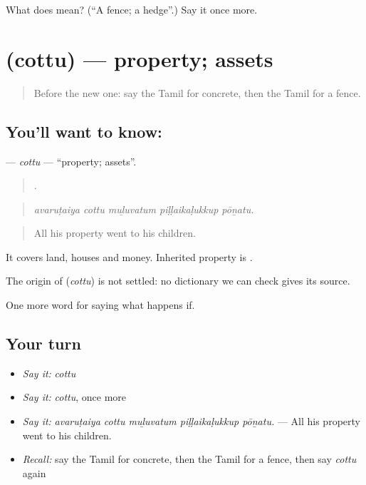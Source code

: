\begin{tcolorbox}[breakable,colback=teal!4,colframe=teal!35!black,title={Before you move on}]
What does  mean? (\textquotedblleft{}A fence; a hedge\textquotedblright{}.) Say it once more.
\end{tcolorbox}
\section[\texorpdfstring{\ta{சொத்து} (cottu)}{சொத்து (cottu)}]{ (cottu) — property; assets}

\label{lesson:TA-C551-cottu}



\begin{quote}
Before the new one: say the Tamil for concrete, then the Tamil for a fence.
\end{quote}

\subsection*{You'll want to know: }
\textbf{} — \emph{cottu} — \textquotedblleft{}property; assets\textquotedblright{}.

\begin{quote}
    .
\end{quote}

\begin{quote}
\emph{avaruṭaiya cottu muḻuvatum piḷḷaikaḷukkup pōṉatu.}
\end{quote}

\begin{quote}
All his property went to his children.
\end{quote}

It covers land, houses and money. Inherited property is  .

\begin{cousinweb}
The origin of \textbf{} (\emph{cottu}) is not settled: no dictionary we can check gives its source.
\end{cousinweb}

\begin{grammarlens}[title={What you've built}]
One more word for saying what happens if.
\end{grammarlens}

\subsection*{Your turn}
\begin{itemize}
\raggedright
  \item \emph{Say it:} \emph{cottu}
  \item \emph{Say it:} \emph{cottu}, once more
  \item \emph{Say it:} \emph{avaruṭaiya cottu muḻuvatum piḷḷaikaḷukkup pōṉatu.} — All his property went to his children.
  \item \emph{Recall:} say the Tamil for concrete, then the Tamil for a fence, then say \emph{cottu} again
\end{itemize}

